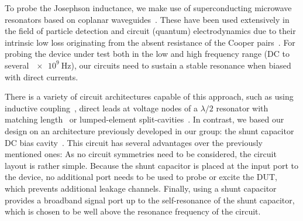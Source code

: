 To probe the Josephson inductance, we make use of superconducting microwave resonators based on coplanar waveguides~\cite{gopplCoplanarWaveguideResonators2008,zmuidzinasSuperconductingMicroresonatorsPhysics2012}.
%
These have been used extensively in the field of particle detection and circuit (quantum) electrodynamics due to their intrinsic low loss originating from the absent resistance of the Cooper pairs~\cite{dayBroadbandSuperconductingDetector2003a,blaisCavityQuantumElectrodynamics2004c,clerkHybridQuantumSystems2020,blaisQuantumInformationProcessing2020}.
%
For probing the device under test both in the low and high frequency range (DC to several $\SI{e9}{\hertz}$), our circuits need to sustain a stable resonance when biased with direct currents.

There is a variety of circuit architectures capable of this approach, such as using inductive coupling~\cite{vissersFrequencytunableSuperconductingResonators2015b}, direct leads at voltage nodes of a $\lambda/2$ resonator with matching length~\cite{chenIntroductionDcBias2011a,liApplyingDirectCurrent2013} or lumped-element split-cavities~\cite{mahashabdeFastTunableHigh2020}.
%
In contrast, we based our design on an architecture previously developed in our group: the shunt capacitor DC bias cavity~\cite{bosmanBroadbandArchitectureGalvanically2015c}.
%
This circuit has several advantages over the previously mentioned ones:
%
As no circuit symmetries need to be considered, the circuit layout is rather simple.
%
Because the shunt capacitor is placed at the input port to the device, no additional port needs to be used to probe or excite the DUT, which prevents additional leakage channels.
%
Finally, using a shunt capacitor provides a broadband signal port up to the self-resonance of the shunt capacitor, which is chosen to be well above the resonance frequency of the circuit.

